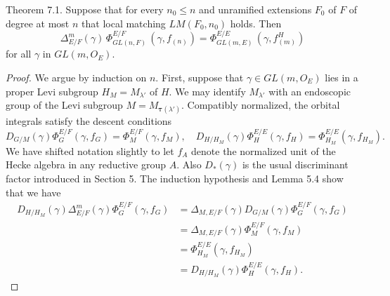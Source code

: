 \documentclass{amsart}
\begin{document}
\proclaim Theorem {7.1}.
Suppose that for every
  $ n_0 \leq n $
and unramified extensions $F_0$ of $F$ of degree at most $n$ that
local matching
  $ LM(F_0, n_0 ) $
holds.
Then
%
$$
  \Delta_{E/F}^{m}
  (\gamma) \,
  \Phi_{GL(n, F)}^{E/F} \,
  (\gamma, f_{(n)}) =
  \Phi_{GL(m, E)}^{E/E} \,
  (\gamma, f^H_{(m)})
$$
%
for all
  $ \gamma $
in
  $ GL(m, O_E )$.
\finishproclaim

\begin{proof}
We argue by
induction on $n$.
First, suppose that $\gamma\in GL(m,O_E)$ lies in a proper Levi
subgroup $H_M=M_{\lambda'}$ of $H$.  We may identify $M_{\lambda'}$ with
an endoscopic group of the Levi subgroup $M = M_{\pmb\tau(\lambda')}$.
Compatibly normalized, the orbital integrals satisfy  the descent conditions
$$D_{G/M}(\gamma)\Phi^{E/F}_G(\gamma,f_G) = \Phi^{E/F}_{M}(\gamma,f_M),\quad
  D_{H/H_M}(\gamma)\Phi^{E/E}_H(\gamma,f_H) = \Phi^{E/E}_{H_M}(\gamma,
  f_{H_M}).$$
We have shifted notation slightly to let $f_A$ denote the normalized unit
of the Hecke algebra in any reductive group $A$.  Also $D_*(\gamma)$ is the
usual discriminant factor introduced in Section 5.
%
The induction hypothesis and Lemma 5.4 show that we have
\begin{align*}
D_{H/H_M}(\gamma)\Delta^m_{E/F}(\gamma)\Phi^{E/F}_G(\gamma,f_G) &=
	\Delta_{M,E/F}(\gamma) D_{G/M}(\gamma)\Phi^{E/F}_G(\gamma,f_G)\\
	&= \Delta_{M,E/F}(\gamma) \Phi^{E/F}_M(\gamma,f_M)\\
	&=  \Phi^{E/E}_{H_M}(\gamma,f_{H_M}) \\
	&= D_{H/H_M}(\gamma)\Phi^{E/E}_H(\gamma,f_H).
\end{align*}


\end{proof}
\end{document}
